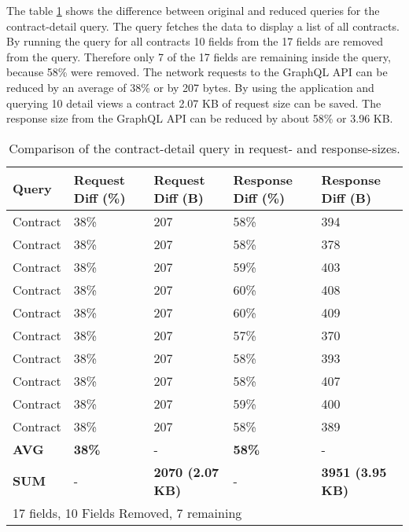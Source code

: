 \noindent The table \ref{table:code:comparison-contract-reduction} shows the difference between original and reduced queries for the contract-detail query. The query fetches the data to display a list of all contracts. By running the query for all contracts 10 fields from the 17 fields are removed from the query. Therefore only 7 of the 17 fields are remaining inside the query, because 58\% were removed. The network requests to the GraphQL \ac{API} can be reduced by an average of 38\% or by 207 bytes. By using the application and querying 10 detail views a contract 2.07 KB of request size can be saved. The response size from the GraphQL \ac{API} can be reduced by about 58\% or 3.96 KB.

\ifshowTables
\begin{table}[H]
  \begin{tabular}{|l|l|l|l|l|}
  \hline
  Query  & Request Diff (\%)  & Request Diff (B) & Response Diff (\%) & Response Diff (B)  \\
  \hline
  Contract & 38\% & 207 & 58\% & 394 \\
  \hline
  Contract & 38\% & 207 & 58\% & 378 \\
  \hline
  Contract & 38\% & 207 & 59\% & 403 \\
  \hline
  Contract & 38\% & 207 & 60\% & 408 \\
  \hline
  Contract & 38\% & 207 & 60\% & 409 \\
  \hline
  Contract & 38\% & 207 & 57\% & 370 \\
  \hline
  Contract & 38\% & 207 & 58\% & 393 \\
  \hline
  Contract & 38\% & 207 & 58\% & 407 \\
  \hline
  Contract & 38\% & 207 & 59\% & 400 \\
  \hline
  Contract & 38\% & 207 & 58\% & 389 \\
  \hline
  \hline
  \textbf{AVG} & \textbf{38\%} & - & \textbf{58\%} & - \\
  \hline
  \hline
  \textbf{SUM} & - & \textbf{2070 (2.07 KB)} & - & \textbf{3951 (3.95 KB)} \\
  \hline
  \multicolumn{5}{l}{17 fields, 10 Fields Removed, 7 remaining}
  \end{tabular}
  \caption{Comparison of the contract-detail query in request- and response-sizes.}\label{table:code:comparison-contract-reduction}
\end{table}
\fi